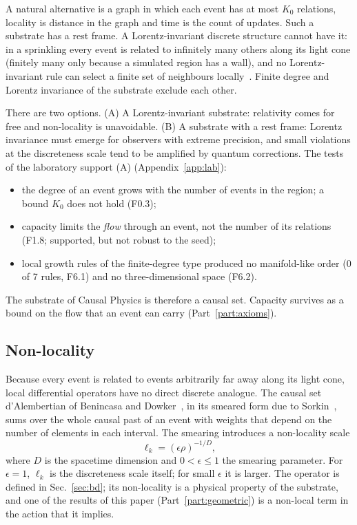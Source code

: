 A natural alternative is a graph in which each event has at most $K_0$ relations, locality is
distance in the graph and time is the count of updates. Such a substrate has a rest frame. A Lorentz-invariant discrete structure cannot have it: in a sprinkling every event is related
to infinitely many others along its light cone (finitely many only because a simulated region has a
wall), and no Lorentz-invariant rule can select a finite set of neighbours
locally~\cite{BombelliHensonSorkin2009}. Finite degree and Lorentz invariance of the substrate
exclude each other.

There are two options. (A) A Lorentz-invariant substrate: relativity comes for free and
non-locality is unavoidable. (B) A substrate with a rest frame: Lorentz invariance must emerge for
observers with extreme precision, and small violations at the discreteness scale tend to be
amplified by quantum corrections. The tests of the laboratory support (A)
(Appendix~\ref{app:lab}):
\begin{itemize}
\item the degree of an event grows with the number of events in the region; a bound $K_0$ does not
  hold (F0.3);
\item capacity limits the \emph{flow} through an event, not the number of its relations (F1.8;
  supported, but not robust to the seed);
\item local growth rules of the finite-degree type produced no manifold-like order (0 of 7 rules,
  F6.1) and no three-dimensional space (F6.2).
\end{itemize}
The substrate of Causal Physics is therefore a causal set. Capacity survives as a bound on the flow that an event
can carry (Part~\ref{part:axioms}).

\subsection{Non-locality}

Because every event is related to events arbitrarily far away along its light cone, local
differential operators have no direct discrete analogue. The causal set d'Alembertian of Benincasa
and Dowker~\cite{BenincasaDowker2010}, in its smeared form due to Sorkin~\cite{Sorkin2007}, sums
over the whole causal past of an event with weights that depend on the number of elements in each
interval. The smearing introduces a non-locality scale
\begin{equation}
  \ell_k=(\epsilon\rho)^{-1/D},
\end{equation}
where $D$ is the spacetime dimension and $0<\epsilon\le1$ the smearing parameter. For $\epsilon=1$,
$\ell_k$ is the discreteness scale itself; for small $\epsilon$ it is larger. The operator is defined in
Sec.~\ref{sec:bd}; its non-locality is a physical property of the substrate, and one of the results of
this paper (Part~\ref{part:geometric}) is a non-local term in the action that it implies.

